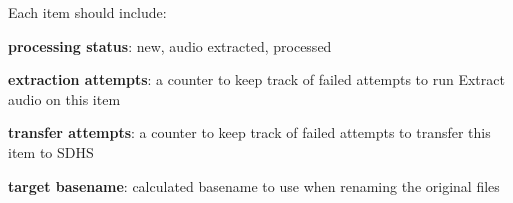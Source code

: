 \documentclass{article}
\renewcommand{\emph}[1]{\textbf{#1}}
\begin{document}
Each item should include:
\begin{compactenum}
\item \emph{processing status}: new, audio extracted, processed
\item \emph{extraction attempts}: a counter to keep track of failed attempts to run Extract audio on this item
\item \emph{transfer attempts}: a counter to keep track of failed attempts to transfer this item to SDHS
\item \emph{target basename}: calculated basename to use when renaming the original files
\end{compactenum}
\end{document}
